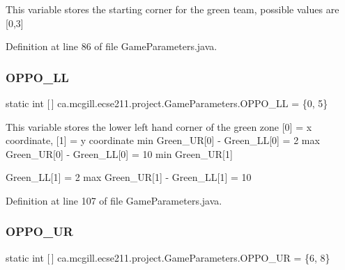 This variable stores the starting corner for the green team, possible values are \mbox{[}0,3\mbox{]} 

Definition at line 86 of file Game\+Parameters.\+java.

\mbox{\label{enumca_1_1mcgill_1_1ecse211_1_1project_1_1_game_parameters_a7ae1bf6f8937b8098396452d8b30e423}} 
\subsubsection{\texorpdfstring{O\+P\+P\+O\+\_\+\+LL}{OPPO\_LL}}
{\footnotesize\ttfamily  static  int \mbox{[}$\,$\mbox{]} ca.\+mcgill.\+ecse211.\+project.\+Game\+Parameters.\+O\+P\+P\+O\+\_\+\+LL = \{0, 5\}\hspace{0.3cm}{\ttfamily [static]}}

This variable stores the lower left hand corner of the green zone \mbox{[}0\mbox{]} = x coordinate, \mbox{[}1\mbox{]} = y coordinate min Green\+\_\+\+UR\mbox{[}0\mbox{]} -\/ Green\+\_\+\+LL\mbox{[}0\mbox{]} = 2 max Green\+\_\+\+UR\mbox{[}0\mbox{]} -\/ Green\+\_\+\+LL\mbox{[}0\mbox{]} = 10 min Green\+\_\+\+UR\mbox{[}1\mbox{]}
\begin{DoxyItemize}
\item Green\+\_\+\+LL\mbox{[}1\mbox{]} = 2 max Green\+\_\+\+UR\mbox{[}1\mbox{]} -\/ Green\+\_\+\+LL\mbox{[}1\mbox{]} = 10 
\end{DoxyItemize}

Definition at line 107 of file Game\+Parameters.\+java.

\mbox{\label{enumca_1_1mcgill_1_1ecse211_1_1project_1_1_game_parameters_a4b23cfeb18fdeecaeecb59280a455170}} 
\subsubsection{\texorpdfstring{O\+P\+P\+O\+\_\+\+UR}{OPPO\_UR}}
{\footnotesize\ttfamily  static  int \mbox{[}$\,$\mbox{]} ca.\+mcgill.\+ecse211.\+project.\+Game\+Parameters.\+O\+P\+P\+O\+\_\+\+UR = \{6, 8\}\hspace{0.3cm}{\ttfamily [static]}}

